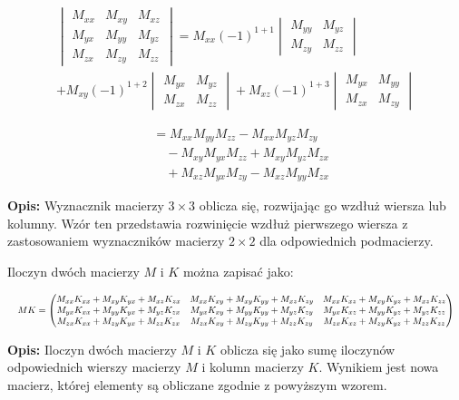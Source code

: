 \begin{multline*}
    \begin{vmatrix}
    M_{xx} & M_{xy} & M_{xz} \\
    M_{yx} & M_{yy} & M_{yz} \\
    M_{zx} & M_{zy} & M_{zz}
    \end{vmatrix}
    =
    M_{xx}(-1)^{1+1}
    \begin{vmatrix}
    M_{yy} & M_{yz} \\
    M_{zy} & M_{zz}
    \end{vmatrix} \\
    + M_{xy}(-1)^{1+2}
    \begin{vmatrix}
    M_{yx} & M_{yz} \\
    M_{zx} & M_{zz}
    \end{vmatrix}
    + M_{xz}(-1)^{1+3}
    \begin{vmatrix}
    M_{yx} & M_{yy} \\
    M_{zx} & M_{zy}
    \end{vmatrix}
    \end{multline*}
    
    \begin{align*}
    &= M_{xx}M_{yy}M_{zz} - M_{xx}M_{yz}M_{zy} \\
    &\quad - M_{xy}M_{yx}M_{zz} + M_{xy}M_{yz}M_{zx} \\
    &\quad + M_{xz}M_{yx}M_{zy} - M_{xz}M_{yy}M_{zx}
    \end{align*}

\vspace{1em}
\noindent
\textbf{Opis:} Wyznacznik macierzy \( 3 \times 3 \) oblicza się, rozwijając go wzdłuż wiersza lub kolumny. Wzór ten przedstawia rozwinięcie wzdłuż pierwszego wiersza z zastosowaniem wyznaczników macierzy \( 2 \times 2 \) dla odpowiednich podmacierzy.




\vspace{1em}
\noindent
Iloczyn dwóch macierzy \( M \) i \( K \) można zapisać jako:

\[
\resizebox{\textwidth}{!}{$
MK =
\begin{pmatrix}
M_{xx}K_{xx} + M_{xy}K_{yx} + M_{xz}K_{zx} & M_{xx}K_{xy} + M_{xy}K_{yy} + M_{xz}K_{zy} & M_{xx}K_{xz} + M_{xy}K_{yz} + M_{xz}K_{zz} \\
M_{yx}K_{xx} + M_{yy}K_{yx} + M_{yz}K_{zx} & M_{yx}K_{xy} + M_{yy}K_{yy} + M_{yz}K_{zy} & M_{yx}K_{xz} + M_{yy}K_{yz} + M_{yz}K_{zz} \\
M_{zx}K_{xx} + M_{zy}K_{yx} + M_{zz}K_{zx} & M_{zx}K_{xy} + M_{zy}K_{yy} + M_{zz}K_{zy} & M_{zx}K_{xz} + M_{zy}K_{yz} + M_{zz}K_{zz}
\end{pmatrix}
$}
\]


\vspace{1em}
\noindent
\textbf{Opis:} Iloczyn dwóch macierzy \( M \) i \( K \) oblicza się jako sumę iloczynów odpowiednich wierszy macierzy \( M \) i kolumn macierzy \( K \). Wynikiem jest nowa macierz, której elementy są obliczane zgodnie z powyższym wzorem.


